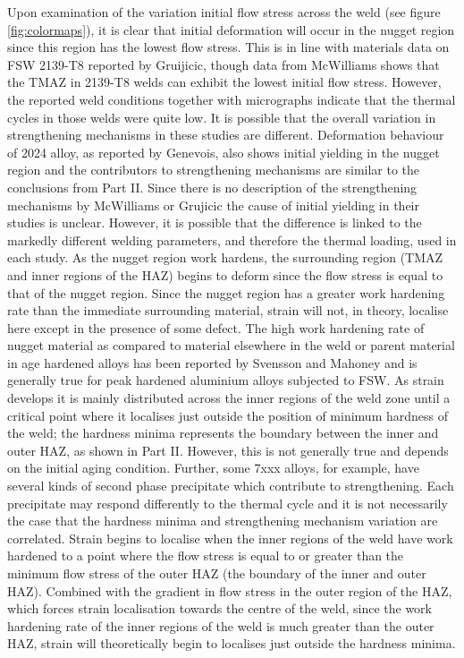 Upon examination of the variation initial flow stress across the weld (see figure \ref{fig:colormaps}), it is clear that initial deformation will occur in the nugget region since this region has the lowest flow stress. 
This is in line with materials data on FSW 2139-T8 reported by Gruijicic, though data from McWilliams shows that the TMAZ in 2139-T8 welds can exhibit the lowest initial flow stress. However, the reported weld conditions together with micrographs indicate that the thermal cycles in those welds were quite low. It is possible that the overall variation in strengthening mechanisms in these studies are different. Deformation behaviour of 2024 alloy, as reported by Genevois, also shows initial yielding in the nugget region and the contributors to strengthening mechanisms are similar to the conclusions from Part II. Since there is no description of the strengthening mechanisms by McWilliams or Grujicic the cause of initial yielding in their studies is unclear. However, it is possible that the difference is linked to the markedly different welding parameters, and therefore the thermal loading, used in each study.
As the nugget region work hardens, the surrounding region (TMAZ and inner regions of the HAZ) begins to deform since the flow stress is equal to that of the nugget region. Since the nugget region has a greater work hardening rate than the immediate surrounding material, strain will not, in theory, localise here except in the presence of some defect. 
The high work hardening rate of nugget material as compared to material elsewhere in the weld or parent material in age hardened alloys has been reported by Svensson and Mahoney and is generally true for peak hardened aluminium alloys subjected to FSW.
As strain develops it is mainly distributed across the inner regions of the weld zone until a critical point where it localises just outside the position of minimum hardness of the weld; the hardness minima represents the boundary between the inner and outer HAZ, as shown in Part II. However, this is not generally true and depends on the initial aging condition. Further, some 7xxx alloys, for example, have several kinds of second phase precipitate which contribute to strengthening. Each precipitate may respond differently to the thermal cycle and it is not necessarily the case that the hardness minima and strengthening mechanism variation are correlated. Strain begins to localise when the inner regions of the weld have work hardened to a point where the flow stress is equal to or greater than the minimum flow stress of the outer HAZ (the boundary of the inner and outer HAZ). Combined with the gradient in flow stress in the outer region of the HAZ, which forces strain localisation towards the centre of the weld, since the work hardening rate of the inner regions of the weld is much greater than the outer HAZ, strain will theoretically begin to localises just outside the hardness minima. 

